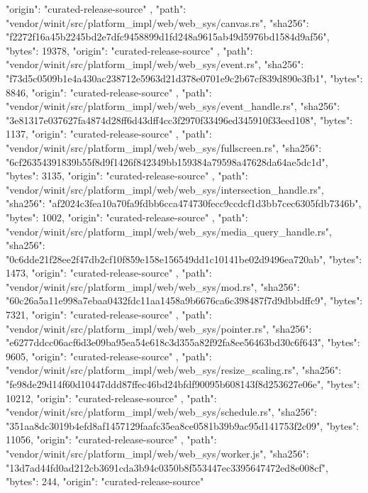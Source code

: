 {{      "origin": "curated-release-source"
    },
    {
      "path": "vendor/winit/src/platform_impl/web/web_sys/canvas.rs",
      "sha256": "f2272f16a45b2245bd2e7dfc9458899d1fd248a9615ab49d5976bd1584d9af56",
      "bytes": 19378,
      "origin": "curated-release-source"
    },
    {
      "path": "vendor/winit/src/platform_impl/web/web_sys/event.rs",
      "sha256": "f73d5c0509b1e4a430ac238712e5963d21d378e0701e9c2b67cf839d890e3fb1",
      "bytes": 8846,
      "origin": "curated-release-source"
    },
    {
      "path": "vendor/winit/src/platform_impl/web/web_sys/event_handle.rs",
      "sha256": "3e81317e037627fa4874d28ff6d43dff4cc3f2970f33496ed345910f33eed108",
      "bytes": 1137,
      "origin": "curated-release-source"
    },
    {
      "path": "vendor/winit/src/platform_impl/web/web_sys/fullscreen.rs",
      "sha256": "6cf26354391839b55f8d9f1426f842349bb159384a79598a47628da64ae5dc1d",
      "bytes": 3135,
      "origin": "curated-release-source"
    },
    {
      "path": "vendor/winit/src/platform_impl/web/web_sys/intersection_handle.rs",
      "sha256": "af2024c3fea10a70fa9fdbb6cca474730fecc9ccdcf1d3bb7cec6305fdb7346b",
      "bytes": 1002,
      "origin": "curated-release-source"
    },
    {
      "path": "vendor/winit/src/platform_impl/web/web_sys/media_query_handle.rs",
      "sha256": "0c6dde21f28ee2f47db2cf10f859e158e156549dd1c10141be02d9496ea720ab",
      "bytes": 1473,
      "origin": "curated-release-source"
    },
    {
      "path": "vendor/winit/src/platform_impl/web/web_sys/mod.rs",
      "sha256": "60c26a5a11e998a7ebaa0432fdc11aa1458a9b6676ca6c398487f7d9dbbdffc9",
      "bytes": 7321,
      "origin": "curated-release-source"
    },
    {
      "path": "vendor/winit/src/platform_impl/web/web_sys/pointer.rs",
      "sha256": "e6277ddcc06acf6d3e09ba95ea54e618c3d355a82f92fa8ee56463bd30c6f643",
      "bytes": 9605,
      "origin": "curated-release-source"
    },
    {
      "path": "vendor/winit/src/platform_impl/web/web_sys/resize_scaling.rs",
      "sha256": "fe98de29d14f60d10447ddd87ffec46bd24bfdf90095b608143f8d253627e06e",
      "bytes": 10212,
      "origin": "curated-release-source"
    },
    {
      "path": "vendor/winit/src/platform_impl/web/web_sys/schedule.rs",
      "sha256": "351aa8dc3019b4efd8af1457129faafc35ea8ce0581b39b9ac95d141753f2c09",
      "bytes": 11056,
      "origin": "curated-release-source"
    },
    {
      "path": "vendor/winit/src/platform_impl/web/web_sys/worker.js",
      "sha256": "13d7ad44fd0ad212cb3691cda3b94c0350b8f553447ec3395647472ed8e008cf",
      "bytes": 244,
      "origin": "curated-release-source"
}}
